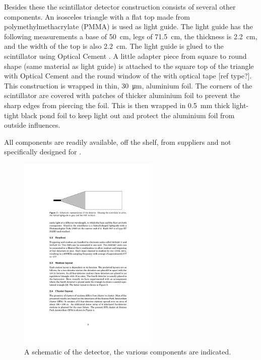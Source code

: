 Besides these the scintillator detector construction consists of several other components. An isosceles triangle with a flat top made from polymethylmethacrylate (PMMA) is used as light guide. The light guide has the following measurements a base of \SI{50}{\centi\meter}, legs of \SI{71.5}{\centi\meter}, the thickness is \SI{2.2}{\centi\meter}, and the width of the top is also \SI{2.2}{\centi\meter}. The light guide is glued to the scintillator using Optical Cement \cite{sgc2014bc600}. A little adapter piece from square to round shape (same material as light guide) is attached to the square top of the triangle with Optical Cement and the round window of the \pmt with optical tape [ref type?]. This construction is wrapped in thin, \SI{30}{\micro\meter}, aluminium foil. The corners of the scintillator are covered with patches of thicker aluminium foil to prevent the sharp edges from piercing the foil. This is then wrapped in \SI{0.5}{\milli\meter} thick light-tight black pond foil to keep light out and protect the aluminium foil from outside influences.

All components are readily available, off the shelf, from suppliers and not specifically designed for \hisparc.

\begin{figure}
    \centering
    \includegraphics[width=0.6\textwidth]
                    {plots/station/schematic_detector}
    \caption{A schematic of the detector, the various components are indicated.}
    \label{fig:schematic_detector}
\end{figure}

